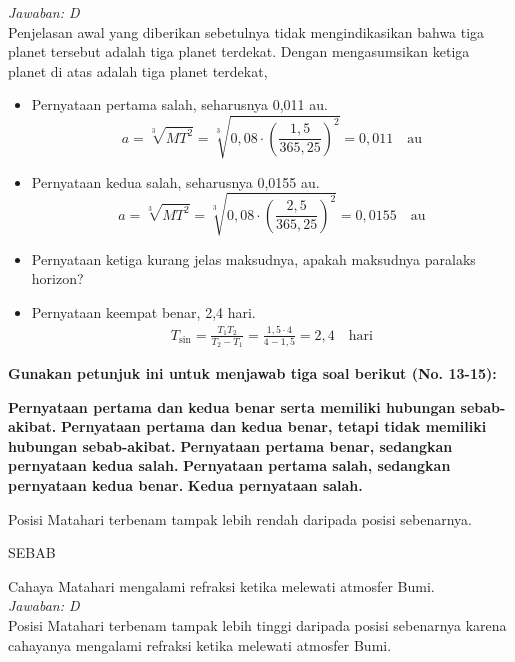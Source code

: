 \documentclass[11pt,fleqn]{exam}
\begin{document}
\begin{questions}
\textit{Jawaban: D} \\
Penjelasan awal yang diberikan sebetulnya tidak mengindikasikan bahwa tiga planet tersebut adalah tiga planet terdekat. Dengan mengasumsikan ketiga planet di atas adalah tiga planet terdekat,
\begin{itemize}
\item Pernyataan pertama salah, seharusnya 0,011 au.
\begin{equation*}
a = \sqrt[3]{MT^2} = \sqrt[3]{0,08 \cdot \left(\frac{1,5}{365,25}\right)^2} = 0,011 \quad \text{au}
\end{equation*}
\item Pernyataan kedua salah, seharusnya 0,0155 au.
\begin{equation*}
a = \sqrt[3]{MT^2} = \sqrt[3]{0,08 \cdot \left(\frac{2,5}{365,25}\right)^2} = 0,0155 \quad \text{au}
\end{equation*}
\item Pernyataan ketiga kurang jelas maksudnya, apakah maksudnya paralaks horizon?
\item Pernyataan keempat benar,  2,4 hari.
\begin{eqnarray*}
T_{\sin} = \frac{T_1 T_2}{T_2 - T_1} = \frac{1,5 \cdot 4}{4 - 1,5} = 2,4 \quad \text{hari}
\end{eqnarray*}
\end{itemize}



\vspace{0.5cm}
\textbf{Gunakan petunjuk ini untuk menjawab tiga soal berikut (No. 13-15):}
\begin{choices}
\choice \textbf{Pernyataan pertama dan kedua benar serta memiliki hubungan sebab-akibat.}
\choice \textbf{Pernyataan pertama dan kedua benar, tetapi tidak memiliki hubungan sebab-akibat.}
\choice \textbf{Pernyataan pertama benar, sedangkan pernyataan kedua salah.}
\choice \textbf{Pernyataan pertama salah, sedangkan pernyataan kedua benar.}
\choice \textbf{Kedua pernyataan salah.}
\end{choices}

\vspace{0.3cm}
\question Posisi Matahari terbenam tampak lebih rendah daripada posisi sebenarnya.
\begin{center}
SEBAB
\end{center}
Cahaya Matahari mengalami refraksi ketika melewati atmosfer Bumi.\\

\textit{Jawaban: D} \\
Posisi Matahari terbenam tampak lebih tinggi daripada posisi sebenarnya karena cahayanya mengalami refraksi ketika melewati atmosfer Bumi.


\end{questions}
\end{document}
